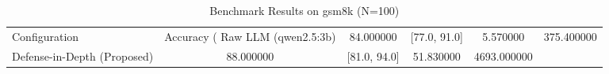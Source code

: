\begin{table}
\caption{Benchmark Results on gsm8k (N=100)}
\label{tab:gsm8k_benchmark}
\begin{tabular}{lcccc}
\toprule
Configuration & Accuracy (%
\midrule
Raw LLM (qwen2.5:3b) & 84.000000 & [77.0, 91.0] & 5.570000 & 375.400000 \\
Defense-in-Depth (Proposed) & 88.000000 & [81.0, 94.0] & 51.830000 & 4693.000000 \\
\bottomrule
\end{tabular}
\end{table}
